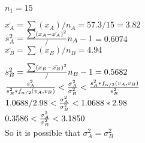 $n_1 = 15$

$\bar{x_A} = \sum(x_A)/n_A = 57.3/15 = 3.82$ \\

$s^2_A = \frac{\sum(x_A-\bar{x_A})^2}/n_A-1 $$= 0.6074$ \\


$\bar{x_B} = \sum(x_B)/n_B = 4.94$

$s^2_B = \frac{\sum(x_B-\bar{x_B})^2}/n_B-1 = 0.5682$ \\


$\frac{s_A^2}{s_B^2 * f_{\alpha/2}(v_A,v_B)} < 
\frac{\sigma_A^2}{\sigma_B^2} 
< \frac{s_A^2 * f_{\alpha/2}(v_A,v_B)}{s^2_B}$ \\

$1.0688/2.98 < 
\frac{\sigma_A^2}{\sigma_B^2}  
< 1.0688 * 2.98$ \\


$0.3586 < 
\frac{\sigma_A^2}{\sigma_B^2}  
< 3.1850$ \\

So it is possible that $\sigma_A^2 = \sigma_B^2$



